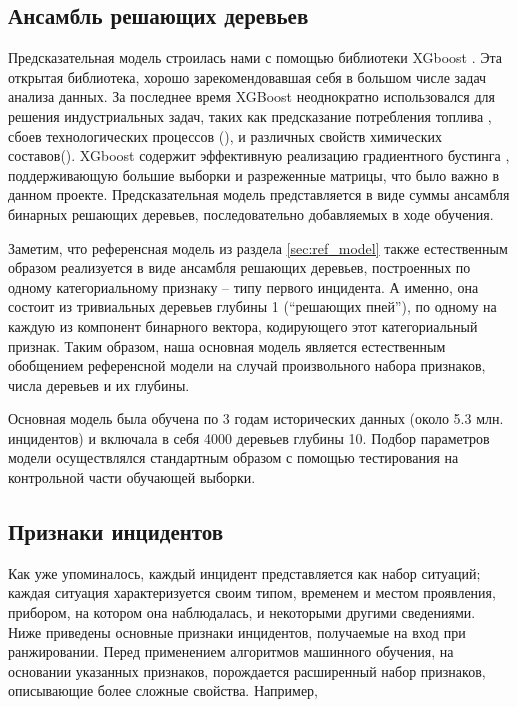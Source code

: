 \subsection{Ансамбль решающих деревьев}\label{sec:xgboost}
Предсказательная модель строилась нами с помощью библиотеки XGboost \cite{chen2016xgboost}. Эта открытая библиотека, хорошо зарекомендовавшая себя в большом числе задач анализа данных\cite{chen2016xgboost}. За последнее время XGBoost неоднократно использовался для решения индустриальных задач, таких как предсказание потребления топлива \cite{horituchi2017predicting}, сбоев технологических процессов (\cite{bosch,DBLP:conf/bigdataconf/Hebert16}), и различных свойств химических составов(\cite{sheridan2016extreme,babajide2016bioactive}). XGboost содержит эффективную реализацию градиентного бустинга \cite{friedman2001greedy}, поддерживающую большие выборки и разреженные матрицы, что было важно в данном проекте. Предсказательная модель представляется в виде суммы ансамбля  бинарных решающих деревьев, последовательно добавляемых в ходе обучения. 

Заметим, что референсная модель из раздела  \ref{sec:ref_model} также естественным образом реализуется в виде ансамбля решающих деревьев, построенных по одному категориальному признаку -- типу первого инцидента. А именно, она состоит из тривиальных деревьев глубины 1 (``решающих пней''), по одному на каждую из компонент бинарного вектора, кодирующего этот категориальный признак. Таким образом, наша основная модель является естественным обобщением референсной модели на случай произвольного набора признаков, числа деревьев и их глубины.

Основная модель была обучена по 3 годам исторических данных (около 5.3 млн. инцидентов) и включала в себя 4000 деревьев глубины 10. Подбор параметров модели осуществлялся стандартным образом с помощью тестирования на контрольной части обучающей выборки.

\subsection{Признаки инцидентов}\label{sec:feature_extraction}
Как уже упоминалось, каждый инцидент представляется как набор ситуаций; каждая ситуация характеризуется своим типом, временем и местом проявления, прибором, на котором она наблюдалась, и некоторыми другими сведениями. Ниже приведены основные признаки инцидентов, получаемые на вход при ранжировании. Перед применением алгоритмов машинного обучения, на основании указанных признаков, порождается расширенный набор признаков, описывающие более сложные свойства. 
Например, 

